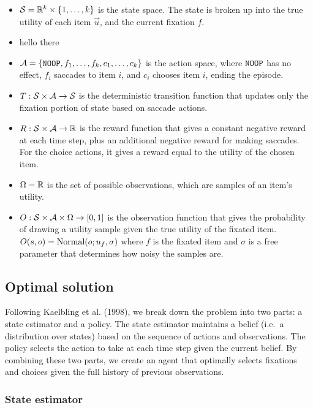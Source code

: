 \documentclass[12pt,a4paperpaper,]{article}
\providecommand{\tightlist}{%
  \setlength{\itemsep}{0pt}\setlength{\parskip}{0pt}}
\begin{document}
\begin{itemize}
\tightlist
\item
  \(\mathcal{S} = \mathbb{R}^k \times \{1, \dots, k\}\) is the state space. The state is
  broken up into the true utility of each item \(\vec{u}\), and the
  current fixation \(f\).
\item
  hello there
\item
  \(\mathcal{A} = \{ \texttt{NOOP}, f_1, \dots, f_k , c_1, \dots, c_k \}\) is the action
  space, where \(\texttt{NOOP}\) has no effect, \(f_i\) saccades to item \(i\),
  and \(c_i\) chooses item \(i\), ending the episode.
\item
  \(T: \mathcal{S} \times \mathcal{A} \rightarrow \mathcal{S}\) is the deterministic transition
  function that updates only the fixation portion of state based on
  saccade actions.
\item
  \(R: \mathcal{S} \times \mathcal{A} \rightarrow \mathbb{R}\) is the reward function that gives a
  constant negative reward at each time step, plus an additional
  negative reward for making saccades. For the choice actions, it gives
  a reward equal to the utility of the chosen item.
\item
  \(\Omega = \mathbb{R}\) is the set of possible observations, which are samples
  of an item's utility.
\item
  \(O: \mathcal{S} \times \mathcal{A} \times \Omega \rightarrow [0, 1]\) is the
  observation function that gives the probability of drawing a utility
  sample given the true utility of the fixated item.
  \(O(s, o) = \mathrm{Normal}(o; u_{f}, \sigma)\) where \(f\) is the fixated
  item and \(\sigma\) is a free parameter that determines how noisy the
  samples are.
\end{itemize}

\subsection{Optimal solution}\label{optimal-solution}

Following Kaelbling et al. (1998), we break down the problem into two
parts: a state estimator and a policy. The state estimator maintains a
belief (i.e.~a distribution over states) based on the sequence of
actions and observations. The policy selects the action to take at each
time step given the current belief. By combining these two parts, we
create an agent that optimally selects fixations and choices given the
full history of previous observations.

\subsubsection{State estimator}\label{state-estimator}
\end{document}
